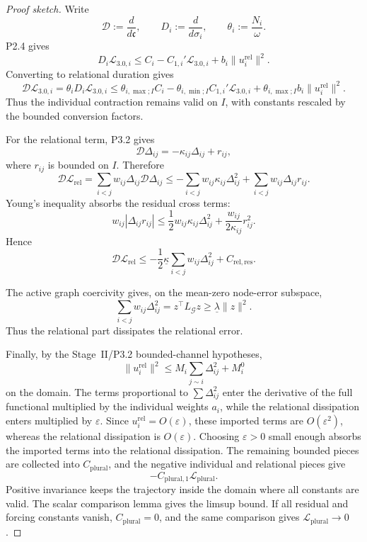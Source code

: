 \documentclass[11pt,a4paper]{article}
\theoremstyle{definition}
\theoremstyle{plain}
\theoremstyle{remark}
\begin{document}
\begin{proof}[Proof sketch]
Write
\[
\mathscr D:=\frac{d}{d\mathfrak c},
\qquad
D_i:=\frac{d}{d\sigma_i},
\qquad
\theta_i:=\frac{N_i}{\omega}.
\]
P2.4 gives
\[
D_i\mathcal L_{3.0,i}
\le
C_i-C_{1,i}'\mathcal L_{3.0,i}
+
b_i\lVert u_i^{\mathrm{rel}}\rVert^2.
\]
Converting to relational duration gives
\[
\mathscr D\mathcal L_{3.0,i}
=
\theta_iD_i\mathcal L_{3.0,i}
\le
\theta_{i,\max;I}C_i
-
\theta_{i,\min;I}C_{1,i}'\mathcal L_{3.0,i}
+
\theta_{i,\max;I}b_i\lVert u_i^{\mathrm{rel}}\rVert^2.
\]
Thus the individual contraction remains valid on \(I\), with constants rescaled by
the bounded conversion factors.

For the relational term, P3.2 gives
\[
\mathscr D\Delta_{ij}
=
-\kappa_{ij}\Delta_{ij}
+
r_{ij},
\]
where \(r_{ij}\) is bounded on \(I\). Therefore
\[
\mathscr D\mathcal L_{\mathrm{rel}}
=
\sum_{i<j}w_{ij}\Delta_{ij}\mathscr D\Delta_{ij}
\le
-\sum_{i<j}w_{ij}\kappa_{ij}\Delta_{ij}^2
+
\sum_{i<j}w_{ij}\Delta_{ij}r_{ij}.
\]
Young's inequality absorbs the residual cross terms:
\[
w_{ij}|\Delta_{ij}r_{ij}|
\le
\frac12 w_{ij}\kappa_{ij}\Delta_{ij}^2
+
\frac{w_{ij}}{2\kappa_{ij}}r_{ij}^2.
\]
Hence
\[
\mathscr D\mathcal L_{\mathrm{rel}}
\le
-\frac12\underline\kappa
\sum_{i<j}w_{ij}\Delta_{ij}^2
+
C_{\mathrm{rel,res}}.
\]

The active graph coercivity gives, on the mean-zero node-error subspace,
\[
\sum_{i<j}w_{ij}\Delta_{ij}^2
=
z^\top L_{\mathcal G}z
\ge
\underline\lambda\lVert z\rVert^2.
\]
Thus the relational part dissipates the relational error.

Finally, by the Stage~II/P3.2 bounded-channel hypotheses,
\[
\lVert u_i^{\mathrm{rel}}\rVert^2
\le
M_i\sum_{j\sim i}\Delta_{ij}^2+M_i^0
\]
on the domain. The terms proportional to \(\sum\Delta_{ij}^2\) enter the derivative
of the full functional multiplied by the individual weights \(a_i\), while the
relational dissipation enters multiplied by \(\varepsilon\). Since
\(u_i^{\mathrm{rel}}=O(\varepsilon)\), these imported terms are \(O(\varepsilon^2)\),
whereas the relational dissipation is \(O(\varepsilon)\). Choosing \(\varepsilon>0\)
small enough absorbs the imported terms into the relational dissipation. The
remaining bounded pieces are collected into \(C_{\mathrm{plural}}\), and the
negative individual and relational pieces give
\[
-C_{\mathrm{plural},1}\mathcal L_{\mathrm{plural}}.
\]
Positive invariance keeps the trajectory inside the domain where all constants are
valid. The scalar comparison lemma gives the limsup bound. If all residual and
forcing constants vanish, \(C_{\mathrm{plural}}=0\), and the same comparison gives
\(\mathcal L_{\mathrm{plural}}\to0\). \qedhere
\end{proof}
\end{document}
